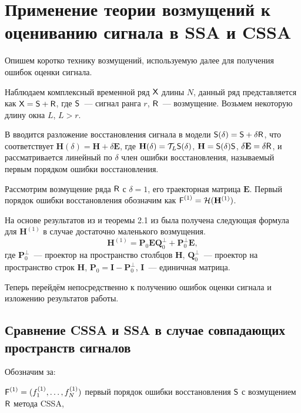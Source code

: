 \documentclass[12pt,a4paper]{article}
\begin{document}
\section{Применение теории возмущений к оцениванию сигнала в SSA и CSSA}
\label{sec:cssa_theor}

Опишем коротко технику возмущений, используемую далее для получения ошибок оценки сигнала.

Наблюдаем комплексный временной ряд $\textsf{X}$ длины $N$, данный ряд представляется как $\textsf{X} = \textsf{S} + \textsf{R}$, где $\textsf{S}$~--- сигнал ранга $r$, $\textsf{R}$~--- возмущение.  Возьмем некоторую длину окна $L$, $L>r$.

В \cite{Nekrutkin} вводится разложение восстановления сигнала в модели $\textsf{S}(\delta) = \textsf{S} + \delta \textsf{R}$, что соответствует $\mathbf{H}(\delta) = \mathbf{H} + \delta \mathbf{E}$, где $\mathbf{H}(\delta) = \mathcal{T}_L \textsf{S}(\delta)$, $\mathbf{H} = \textsf{S}(\delta)\textsf{S}$, $\delta\mathbf{E} = \delta \textsf{R}$, и рассматривается линейный по $\delta$ член ошибки восстановления, называемый первым порядком ошибки восстановления.

Рассмотрим возмущение ряда $\textsf{R}$ с $\delta = 1$, его траекторная матрица $\mathbf{E}$. Первый порядок ошибки восстановления обозначим как $\textsf{F}^{(1)} = \mathcal{H}(\mathbf{H}^{(1)})$.

На основе результатов из \cite[стр.12]{Konstantinov} и теоремы 2.1 из \cite{Nekrutkin} была получена следующая формула для $\mathbf{H}^{(1)}$ в случае достаточно маленького возмущения.
\begin{equation} \label{eq:main}
	\mathbf{H}^{(1)} = \mathbf{P}_0 \mathbf{E} \mathbf{Q}^{\perp}_0 + \mathbf{P}^{\perp}_0 \mathbf{E},
\end{equation}
где $\mathbf{P}^{\perp}_0$~--- проектор на пространство столбцов $\mathbf{H}$, $\mathbf{Q}^{\perp}_0$~--- проектор на пространство строк $\mathbf{H}$, $\mathbf{P}_0 = \mathbf{I} - \mathbf{P}^{\perp}_0$, $\mathbf{I}$~--- единичная матрица.

Теперь перейдём непосредственно к получению ошибок оценки сигнала и изложению результатов работы.

\subsection{Сравнение CSSA и SSA в случае совпадающих пространств сигналов}

Обозначим за:

$\textsf{F}^{(1)} = (f^{(1)}_1, \ldots, f^{(1)}_N)$ первый порядок ошибки восстановления $\textsf{S}$ с возмущением $\textsf{R}$ метода CSSA,
\end{document}
